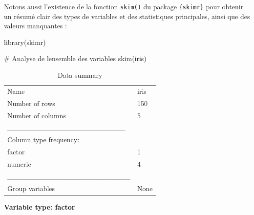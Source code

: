 \documentclass[
  letterpaper,
]{book}
\newenvironment{Shaded}{\begin{snugshade}}{\end{snugshade}}
\newcommand{\CommentTok}[1]{\textcolor[rgb]{0.37,0.37,0.37}{#1}}
\newcommand{\FunctionTok}[1]{\textcolor[rgb]{0.28,0.35,0.67}{#1}}
\newcommand{\NormalTok}[1]{\textcolor[rgb]{0.00,0.23,0.31}{#1}}
\begin{document}
Notons aussi l'existence de la fonction \texttt{skim()} du package
\texttt{\{skimr\}} pour obtenir un résumé clair des types de variables
et des statistiques principales, ainsi que des valeurs manquantes :

\begin{Shaded}
\begin{Highlighting}[]
\FunctionTok{library}\NormalTok{(skimr)}

\CommentTok{\# Analyse de l\textquotesingle{}ensemble des variables}
\FunctionTok{skim}\NormalTok{(iris)}
\end{Highlighting}
\end{Shaded}

\begin{longtable}[]{@{}ll@{}}
\caption{Data summary}\tabularnewline
\toprule\noalign{}
\endfirsthead
\endhead
\bottomrule\noalign{}
\endlastfoot
Name & iris \\
Number of rows & 150 \\
Number of columns & 5 \\
\_\_\_\_\_\_\_\_\_\_\_\_\_\_\_\_\_\_\_\_\_\_\_ & \\
Column type frequency: & \\
factor & 1 \\
numeric & 4 \\
\_\_\_\_\_\_\_\_\_\_\_\_\_\_\_\_\_\_\_\_\_\_\_\_ & \\
Group variables & None \\
\end{longtable}

\textbf{Variable type: factor}
\end{document}

